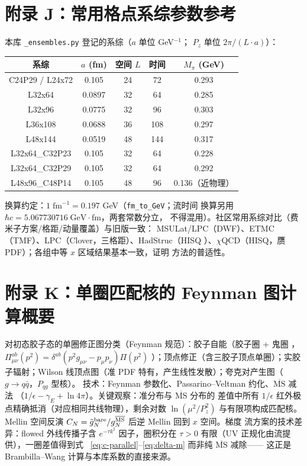 \documentclass[11pt,a4paper]{ctexart}
\newcommand{\LaMET}{\text{LaMET}}
\newcommand{\MSbarM}{\overline{\text{MS}}}
\newcommand{\code}[1]{\texttt{#1}}
\begin{document}
\section{附录 J：常用格点系综参数参考}
\label{sec:appendix-ensemble}

本库 \code{\_ensembles.py} 登记的系综（$a$ 单位 GeV$^{-1}$；
$P_z$ 单位 $2\pi/(L\cdot a)$）：

\begin{center}
\small
\begin{tabular}{c c c c c}
\toprule
\textbf{系综} & \textbf{$a$ (fm)} & \textbf{空间 $L$} & \textbf{时间}
& \textbf{$M_\pi$ (GeV)} \\
\midrule
C24P29 / L24x72 & 0.105 & 24 & 72 & 0.293 \\
L32x64 & 0.0897 & 32 & 64 & 0.285 \\
L32x96 & 0.0775 & 32 & 96 & 0.303 \\
L36x108 & 0.0688 & 36 & 108 & 0.297 \\
L48x144 & 0.0519 & 48 & 144 & 0.317 \\
L32x64\_C32P23 & 0.105 & 32 & 64 & 0.228 \\
L32x64\_C32P29 & 0.105 & 32 & 64 & 0.292 \\
L48x96\_C48P14 & 0.105 & 48 & 96 & 0.136（近物理） \\
\bottomrule
\end{tabular}
\end{center}
换算约定：$1\;\mathrm{fm}^{-1}=0.197$ GeV（\code{fm\_to\_GeV}；流时间
换算另用 $\hbar c=5.067730716\;\mathrm{GeV\cdot fm}$，两套常数分立，
不得混用）。社区常用系综对比（费米子方案/格距/动量覆盖）与旧版一致：
MSULat/LPC（DWF）、ETMC（TMF）、LPC（Clover，三格距）、HadStruc（HISQ
）、$\chi$QCD（HISQ，赝 PDF）；各组中等 $x$ 区域结果基本一致，证明
\LaMET{} 方法的普适性。

\section{附录 K：单圈匹配核的 Feynman 图计算概要}

对初态胶子态的单圈修正图分类（Feynman 规范）：胶子自能（胶子圈 + 鬼圈
，$\Pi_{\mu\nu}^{ab}(p^2)=\delta^{ab}(p^2g_{\mu\nu}-p_\mu p_\nu)\Pi(p^2)$
）；顶点修正（含三胶子顶点单圈）；实胶子辐射；Wilson 线顶点图（准 PDF
特有，产生线性发散）；夸克对产生图（$g\to q\bar q$，$P_{qg}$ 型核）。
技术：Feynman 参数化、Passarino--Veltman 约化、$\MSbarM$ 减法
（$1/\epsilon-\gamma_E+\ln4\pi$）。关键观察：准分布与 $\MSbarM$ 分布的
差值中所有 $1/\epsilon$ 红外极点精确抵消（对应相同共线物理），剩余对数
$\ln(\mu^2/P_z^2)$ 与有限项构成匹配核。Mellin 空间反演
$C_N=\tilde g_N^{\rm bare}/g_N^{\MSbarM}$ 后逆 Mellin 回到 $x$ 空间。梯度
流方案的技术差异：flowed 外线传播子含 $e^{-\tau k^2}$ 因子，圈积分在
$\tau>0$ 有限（UV 正规化由流提供），一圈差值得到式
~\eqref{eq:c-parallel}--\eqref{eq:delta-m} 而非纯 $\MSbarM$ 减除——
这正是 Brambilla--Wang 计算与本库系数的直接来源。
\end{document}
